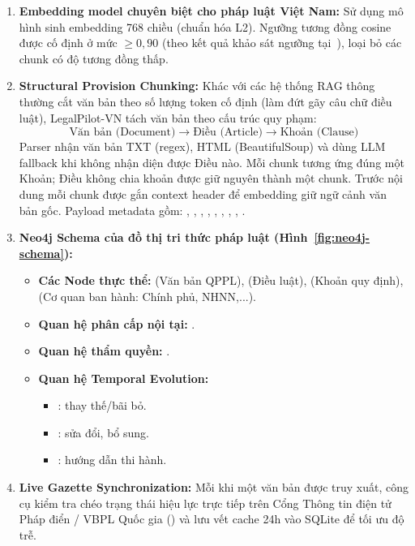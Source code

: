 \documentclass[10pt,a4paper]{article}
\begin{document}
\begin{enumerate}
  \item \textbf{Embedding model chuyên biệt cho pháp luật Việt Nam:} Sử dụng mô hình  sinh embedding 768 chiều (chuẩn hóa L2). Ngưỡng tương đồng cosine được cố định ở mức $\ge 0{,}90$ (theo kết quả khảo sát ngưỡng tại~\cite[Hình 2a]{phan2026sbvlawgraph}), loại bỏ các chunk có độ tương đồng thấp.
  \item \textbf{Structural Provision Chunking:} Khác với các hệ thống RAG thông thường cắt văn bản theo số lượng token cố định (làm đứt gãy câu chữ điều luật), LegalPilot-VN tách văn bản theo cấu trúc quy phạm:
  $$\text{Văn bản (Document)} \longrightarrow \text{Điều (Article)} \longrightarrow \text{Khoản (Clause)}$$
  Parser nhận văn bản TXT (regex), HTML (BeautifulSoup) và dùng LLM fallback khi không nhận diện được Điều nào. Mỗi chunk tương ứng đúng một Khoản; Điều không chia khoản được giữ nguyên thành một chunk. Trước nội dung mỗi chunk được gắn context header  để embedding giữ ngữ cảnh văn bản gốc. Payload metadata gồm: , , , , , , , , .
  \item \textbf{Neo4j Schema của đồ thị tri thức pháp luật (Hình~\ref{fig:neo4j-schema}):}
  \begin{itemize}
    \item { \textbf{Các Node thực thể:}  (Văn bản QPPL),  (Điều luật),  (Khoản quy định),  (Cơ quan ban hành: Chính phủ, NHNN,...).\par}
    \item \textbf{Quan hệ phân cấp nội tại:} .
    \item \textbf{Quan hệ thẩm quyền:} .
    \item \textbf{Quan hệ Temporal Evolution:}
    \begin{itemize}
      \item {}: thay thế/bãi bỏ.
      \item {}: sửa đổi, bổ sung.
      \item {}: hướng dẫn thi hành.
    \end{itemize}
  \end{itemize}

  \item \textbf{Live Gazette Synchronization:} Mỗi khi một văn bản được truy xuất, công cụ  kiểm tra chéo trạng thái hiệu lực trực tiếp trên Cổng Thông tin điện tử Pháp điển / VBPL Quốc gia () và lưu vết cache 24h vào SQLite để tối ưu độ trễ.
\end{enumerate}
\end{document}
